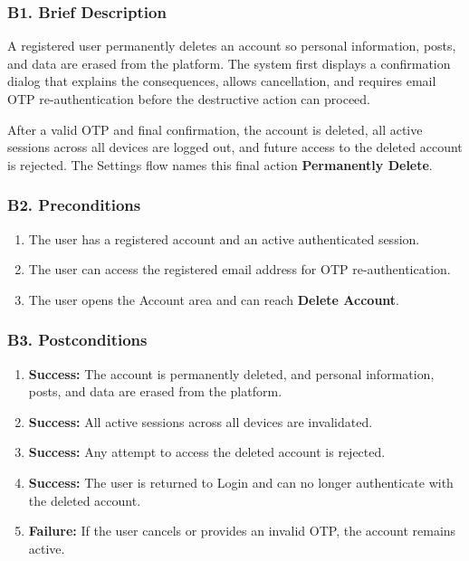 \documentclass[12pt]{article}
\begin{document}
\hypertarget{sec:b1-brief-description}{}
\subsubsection*{B1. Brief Description}
\par\medskip

A registered user permanently deletes an account so personal information, posts, and data are erased from the platform. The system first displays a confirmation dialog that explains the consequences, allows cancellation, and requires email OTP re-authentication before the destructive action can proceed.
\par\medskip

After a valid OTP and final confirmation, the account is deleted, all active sessions across all devices are logged out, and future access to the deleted account is rejected. The Settings flow names this final action \textbf{Permanently Delete}.
\par\medskip

\hypertarget{sec:b2-preconditions}{}
\subsubsection*{B2. Preconditions}
\par\medskip

\begin{enumerate}
\item The user has a registered account and an active authenticated session.
\item The user can access the registered email address for OTP re-authentication.
\item The user opens the Account area and can reach \textbf{Delete Account}.
\end{enumerate}
\par\medskip

\hypertarget{sec:b3-postconditions}{}
\subsubsection*{B3. Postconditions}
\par\medskip

\begin{enumerate}
\item \textbf{Success:} The account is permanently deleted, and personal information, posts, and data are erased from the platform.
\item \textbf{Success:} All active sessions across all devices are invalidated.
\item \textbf{Success:} Any attempt to access the deleted account is rejected.
\item \textbf{Success:} The user is returned to Login and can no longer authenticate with the deleted account.
\item \textbf{Failure:} If the user cancels or provides an invalid OTP, the account remains active.
\end{enumerate}
\par\medskip
\end{document}
